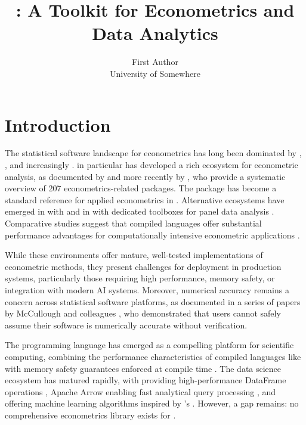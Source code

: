 \documentclass[article]{jss}
\author{First Author\\University of Somewhere}
\title{\pkg{prompt2analytics}: A \proglang{Rust} Toolkit for Econometrics and Data Analytics}
\begin{document}

\section{Introduction} \label{sec:intro}

The statistical software landscape for econometrics has long been dominated by
 \citep{R}, , and increasingly .
 in particular has developed a rich ecosystem for econometric analysis,
as documented by \cite{Zeileis+Koenker:2008} and more recently by
\cite{Michelaki+Tsagris:2025}, who provide a systematic overview of 207
econometrics-related  packages. The  package
\citep{Kleiber+Zeileis:2008, AER} has become a standard reference for applied
econometrics in . Alternative ecosystems have emerged in
 with  \citep{Santiago-Calderon:2020}
and in  with dedicated toolboxes for panel data analysis
\citep{Alvarez+Barbero+Zofio:2017}. Comparative studies suggest that compiled
languages offer substantial performance advantages for computationally intensive
econometric applications \citep{Aruoba+Fernandez-Villaverde:2015,
Duarte+Duarte+Fonseca+Montecinos:2020}.

While these environments offer mature, well-tested implementations of econometric
methods, they present challenges for deployment in production systems, particularly
those requiring high performance, memory safety, or integration with modern AI
systems. Moreover, numerical accuracy remains a concern across statistical software
platforms, as documented in a series of papers by McCullough and colleagues
\citep{McCullough:1997, McCullough+Vinod:1999, McCullough:1999b}, who demonstrated
that users cannot safely assume their software is numerically accurate without
verification.

The  programming language has emerged as a compelling platform for
scientific computing, combining the performance characteristics of compiled
languages like  with memory safety guarantees enforced at compile
time \citep{Rust}. The  data science ecosystem has matured rapidly,
with  providing high-performance DataFrame operations \citep{polars},
Apache Arrow  enabling fast analytical query processing
\citep{Lamb+etal:2024}, and  \citep{linfa} offering machine learning
algorithms inspired by 's . However, a gap
remains: no comprehensive econometrics library exists for .
\end{document}
